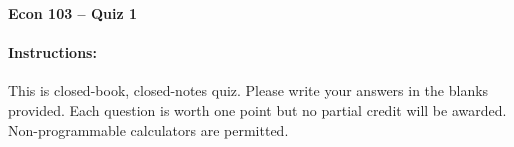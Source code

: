 \documentclass[addpoints,10pt]{exam}
\begin{document}
\thispagestyle{empty}

\noindent \textbf{Econ 103 --  Quiz 1}

\vspace{15pt}
\noindent
{}

\paragraph{Instructions: } This is closed-book, closed-notes quiz. Please write your answers in the blanks provided. Each question is worth one point but no partial credit will be awarded. Non-programmable calculators are permitted.

\vspace{5pt}

\setlength\answerlinelength{2in}
\end{document}
